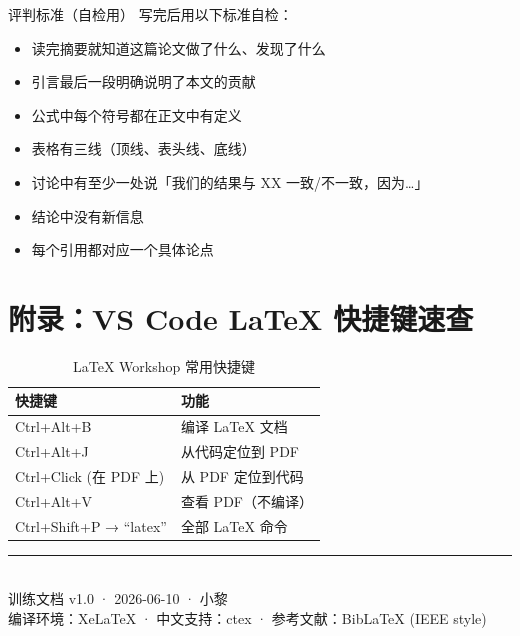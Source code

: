 \documentclass[12pt,a4paper]{ctexart}
\begin{document}
\begin{writingtip}{评判标准（自检用）}
    写完后用以下标准自检：
    \begin{itemize}
        \item [ ] 读完摘要就知道这篇论文做了什么、发现了什么
        \item [ ] 引言最后一段明确说明了本文的贡献
        \item [ ] 公式中每个符号都在正文中有定义
        \item [ ] 表格有三线（顶线、表头线、底线）
        \item [ ] 讨论中有至少一处说「我们的结果与 XX 一致/不一致，因为…」
        \item [ ] 结论中没有新信息
        \item [ ] 每个引用都对应一个具体论点
    \end{itemize}
\end{writingtip}


\section*{附录：VS Code LaTeX 快捷键速查}

\begin{table}[h]
\centering
\caption{LaTeX Workshop 常用快捷键}
\begin{tabular}{ll}
\toprule
\textbf{快捷键}          & \textbf{功能} \\
\midrule
Ctrl+Alt+B               & 编译 LaTeX 文档 \\
Ctrl+Alt+J               & 从代码定位到 PDF \\
Ctrl+Click (在 PDF 上)   & 从 PDF 定位到代码 \\
Ctrl+Alt+V               & 查看 PDF（不编译） \\
Ctrl+Shift+P → ``latex'' & 全部 LaTeX 命令 \\
\bottomrule
\end{tabular}
\end{table}

\vspace{1cm}

\begin{center}
\rule{0.5\textwidth}{0.4pt}\\[1em]
{\small 训练文档 v1.0 · 2026-06-10 · 小黎}\\[0.3em]
{\small 编译环境：XeLaTeX · 中文支持：ctex · 参考文献：BibLaTeX (IEEE style)}
\end{center}
\end{document}

